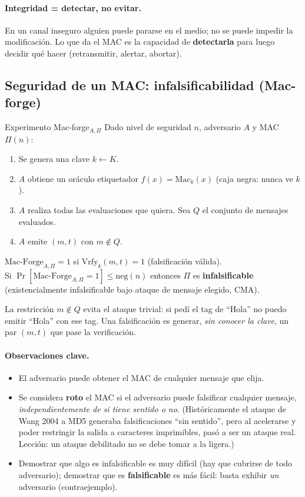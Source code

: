 \documentclass[../main.tex]{subfiles}
\begin{document}
\paragraph{Integridad = detectar, no evitar.} En un canal inseguro alguien puede
pararse en el medio; no se puede impedir la modificación. Lo que da el MAC es la
capacidad de \textbf{detectarla} para luego decidir qué hacer (retransmitir, alertar,
abortar).

\subsection{Seguridad de un MAC: infalsificabilidad (Mac-forge)}

\begin{definicion}{Experimento Mac-forge$_{A,\Pi}$}
Dado nivel de seguridad $n$, adversario $A$ y MAC $\Pi(n)$:
\begin{enumerate}[leftmargin=1.6em,nosep]
  \item Se genera una clave $k \leftarrow K$.
  \item $A$ obtiene un oráculo etiquetador $f(x)=\mathrm{Mac}_k(x)$ (caja negra: nunca ve $k$).
  \item $A$ realiza todas las evaluaciones que quiera. Sea $Q$ el conjunto de mensajes evaluados.
  \item $A$ emite $(m, t)$ con $m \notin Q$.
\end{enumerate}
$\mathrm{Mac\text{-}Forge}_{A,\Pi} = 1$ si $\mathrm{Vrfy}_k(m,t)=1$ (falsificación válida).\\
Si $\Pr[\mathrm{Mac\text{-}Forge}_{A,\Pi}=1] \le \mathrm{neg}(n)$ entonces $\Pi$ es
\textbf{infalsificable} (existencialmente infalsificable bajo ataque de mensaje
elegido, CMA).
\end{definicion}

La restricción $m \notin Q$ evita el ataque trivial: si pedí el tag de ``Hola'' no
puedo emitir ``Hola'' con ese tag. Una falsificación es generar, \emph{sin conocer la
clave}, un par $(m,t)$ que pase la verificación.

\paragraph{Observaciones clave.}
\begin{itemize}[leftmargin=1.4em]
  \item El adversario puede obtener el MAC de cualquier mensaje que elija.
  \item Se considera \textbf{roto} el MAC si el adversario puede falsificar cualquier
  mensaje, \emph{independientemente de si tiene sentido o no}. (Históricamente el
  ataque de Wang 2004 a MD5 generaba falsificaciones ``sin sentido'', pero al
  acelerarse y poder restringir la salida a caracteres imprimibles, pasó a ser un
  ataque real. Lección: un ataque debilitado no se debe tomar a la ligera.)
  \item Demostrar que algo es infalsificable es muy difícil (hay que cubrirse de todo
  adversario); demostrar que es \textbf{falsificable} es más fácil: basta exhibir
  \emph{un} adversario (contraejemplo).
\end{itemize}
\end{document}
